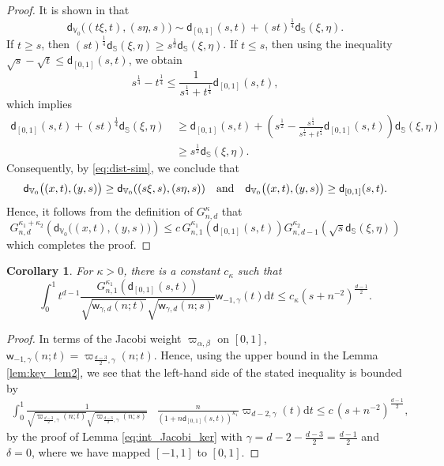 \documentclass{amsart}
\newtheorem{cor}[thm]{Corollary}
\theoremstyle{remark}
\def\d{\mathrm{d}}
\def\a{{\alpha}}
\def\b{{\beta}}
\def\g{{\gamma}}
\def\k{{\kappa}}
\def\SS{{\mathbb S}}
\def\VV{{\mathbb V}}
\def\d{\mathrm{d}}
\def\sd{{\mathsf d}}
\def\sw{{\mathsf w}}
\def\a{{\alpha}}
\def\b{{\beta}}
\def\g{{\gamma}}
\def\k{{\kappa}}
\def\SS{{\mathbb S}}
\def\VV{{\mathbb V}}
\def\f{\frac}
\def\f{\frac}
\begin{document}
\begin{proof}
It is shown in \cite[Proposition 4.3]{X21} that
\begin{equation}\label{eq:dist-sim}
  \sd_{\VV_0} \big((t\xi,t),(s\eta, s) \big) \sim \sd_{[0,1]}(s,t) + (s t)^{\f14} \sd_{\SS}(\xi,\eta).
\end{equation}
If $t \ge s$, then $(s t)^{\f14} \sd_{\SS}(\xi,\eta) \ge s^{\f12} \sd_{\SS}(\xi,\eta)$. If $t \le s$, then using the inequality 
$\sqrt{s} - \sqrt{t} \le \sd_{[0,1]}(s,t)$, we obtain
$$
    s^{\f14} - t^{\f14} \le \frac{1} {s^{\f14} + t^{\f14} } \sd_{[0,1]}(s,t),
$$
which implies 
\begin{align*}
  \sd_{[0,1]}(s,t) + (s t)^{\f14} \sd_{\SS}(\xi,\eta) \, &  \ge \sd_{[0,1]}(s,t) + \left( s^\f12 - \frac{s^{\f14}}{s^{\f14} + t^{\f14}}
     \sd_{[0,1]}(s,t) \right)  \sd_{\SS}(\xi,\eta)  \\
    &  \ge s^{\f12}\sd_{\SS}(\xi,\eta). %
\end{align*}
Consequently, by \eqref{eq:dist-sim}, we conclude that 
$$
   \sd_{\VV_0} \big((x,t),(y,s) \big) \ge \sd_{\VV_0}((s\xi,s),(s \eta,s)) \quad \hbox{and}\quad  
    \sd_{\VV_0} \big((x,t),(y,s) \big) \ge \sd_{[0,1]}(s, t). 
$$
Hence, it follows from the definition of $G_{n,d}^\k$ that
$$
  G_{n,d}^{\k_1+\k_2}\left( \sd_{\VV_0} \big((x,t),(y,s)\big) \right) \le c \,
  G_{n,1}^{\k_1}\left( \sd_{[0,1]} (s,t)\right) G_{n,d-1}^{\k_2}\left( \sqrt{s} \sd_{\SS}(\xi,\eta) \right)
$$
which completes the proof. 
\end{proof}

\begin{cor}\label{cor:key_int}
For $\k > 0$,  there is a constant $c_\k$ such that 
\begin{equation} \label{eq:key_int1}
  \int_0^1 t^{d-1} \frac{G_{n,1}^{\k_1}\left(\sd_{[0,1]}(s,t)\right) }{\sqrt{\sw_{\g,d}(n;t)}\sqrt{\sw_{\g,d}(n;s)}} \sw_{-1,\g}(t) \d t
     \le c_\k (s+n^{-2})^{\frac{d-1}{2}}.
\end{equation}
\end{cor}

\begin{proof}
In terms of the Jacobi weight $\varpi_{\a,\b}$ on $[0,1]$, $\sw_{-1,\g}(n;t) = \varpi_{\frac{d-3}{2},\g}(n;t)$. Hence, using the 
upper bound in the Lemma \ref{lem:key_lem2}, we see that the left-hand side of the stated inequality is bounded by 
\begin{align*}
  \int_0^1  \frac{1}{\sqrt{\varpi_{\frac{d-3}{2},\g}(n;t)}\sqrt{\varpi_{\frac{d-3}{2},\g}(n;s)}} & \frac{n}{(1+n \sd_{[0,1]}(s,t))^{\k_1}}
      \varpi_{d-2,\g}(t) \d t    \le c\, (s+n^{-2})^{\frac{d-1}{2}}, 
\end{align*}
by the proof of Lemma \ref{eq:int_Jacobi_ker} with $\g = d-2- \frac{d-3}{2} = \frac{d-1}{2}$ and $\delta = 0$, where we
have mapped $[-1,1]$ to $[0,1]$. 
\end{proof}
\end{document}
